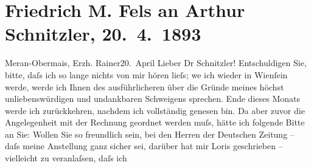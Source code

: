 

         
         \renewcommand{\erwaehntePersonen}{Personen: Josef Drassl, Hugo von Hofmannsthal}
         \renewcommand{\erwaehnteInstitutionen}{Institutionen: Deutsche Zeitung}
         \renewcommand{\erwaehnteOrte}{Orte: Erzherzog Rainer, Meran, Wien}
         \renewcommand{\erwaehnteWerke}{}
               \section[Friedrich M. Fels an Arthur Schnitzler, 20. 4. 1893]{ Friedrich M. Fels an Arthur Schnitzler, 20. 4. 1893}\nopagebreak{}\rehead{ }\begin{ledgroupsized}[t]{13cm}\normalsize\beginnumbering \toendnotes[C]{\smallbreak\pagebreak[2]} 
\toendnotes[C]{\smallbreak}\pstart
           \raggedleft{}{\pb}Meran-Obermais, Erzh. Rainer20. April \label{K_L00198_1v}\label{K_L00198_1h}\pend
           \pstart\center{}Lieber Dr Schnitzler!\pend\pstart
           Entschuldigen Sie, bitte, daſs ich so lange nichts von mir hören lieſs; we{\geminationn} ich wieder in Wienſein werde, werde ich Ihnen des
                    ausführlicheren über die Gründe meines höchst unliebenswürdigen und undankbaren
                    Schweigens sprechen. Ende dieses Monats werde ich zurückkehren, nachdem ich
                    vollständig genesen bin. Da aber zuvor die Angelegenheit mit der Rechnung
                    geordnet werden muſs, hätte ich folgende Bitte an Sie: Wollen Sie so freundlich
                    sein, bei den Herren der Deutschen Zeitung –
                    daſs meine Anstellung ganz sicher sei, darüber hat mir Loris geschrieben – vielleicht zu veranlaſsen, daſs ich

\end{ledgroupsized}
